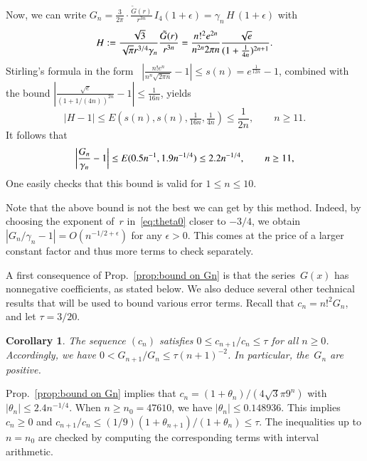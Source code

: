 \documentclass[10pt, conference]{IEEEtran}
\newcommand{\abs}[1]{\mathopen|#1\mathclose|}
\newtheorem{corollary}{Corollary}
\begin{document}
\begin{IEEEproof}
  Now, we can write $G_n = \frac{3}{2\pi}\cdot\frac{\tilde{G}(r)}{r^{3n}}\,I_4(1+\epsilon) = \gamma_n\,H\,(1+\epsilon)$ with
  \[
    H := {\frac{\sqrt{3}}{\sqrt{\pi} r^{3/4} {\gamma}_n}} {\frac{\tilde{G}(r)}{r^{3n}}}\\
    = {\frac{n!^2e^{2n}}{n^{2n}2{\pi}n}}{\frac{\sqrt{e}}{(1+{\frac{1}{4n}})^{2n+1}}}.
  \]
  Stirling's formula in the form~\cite{Robbins1955}
  $\left| \frac{n!e^n}{n^n  \sqrt{2 \pi n}} - 1 \right| \leq s(n) =  e^{\frac1{12n}}-1$,
  combined with the bound
  $ \left| \frac{\sqrt{e}}{(1 + 1 /(4 n))^{2 n}}
     - 1 \right| \leq \frac{1}{16 n} $,
  yields
  \begin{equation}
    \abs{H - 1} \leq E\left(s(n), s(n),
    \tfrac{1}{16 n}, \tfrac{1}{4 n}\right) \leq \frac{1}{2 n},
    \qquad n \geq 11.
    \label{eq:bound A}
  \end{equation}
  It follows that
  \[
    \left|{\frac{G_n}{{\gamma}_n}}-1\right|\leq E(0.5n^{-1},1.9n^{-1/4})\\
    \leq 2.2n^{-1/4},
    \hspace{2em} n \geq 11,
  \]
  One easily checks that this bound is valid for
  $1 \leq n \leq 10$.
\end{IEEEproof}

Note that the above bound is not the best we can get by this method.
Indeed, by choosing the exponent of~$r$ in~\eqref{eq:theta0} closer to $-3/4$, we obtain~$|G_n/\gamma_n-1|=O(n^{-1/2+\epsilon})$ for any $\epsilon>0$. This comes at the price of a larger constant factor and thus more terms to check separately.

A first consequence of Prop.~\ref{prop:bound on Gn} is that the series~$G(x)$ has nonnegative coefficients, as stated below.
We also deduce several other technical results that will be used to bound various error terms.
Recall that $c_n = n!^2 G_n$, and let $\tau = 3/20$.

\begin{corollary}
    \label{cor:positivity}  The sequence $(c_n)$ satisfies $0 \le c_{n+1}/c_n \le \tau$ for all $n \geq 0$. Accordingly, we have $0 < G_{n+1}/G_n \le \tau (n+1)^{-2}$.
    In particular, the~$G_n$ are positive.
\end{corollary}

\begin{IEEEproof}
 Prop.~\ref{prop:bound on Gn} implies that $c_n = (1+\theta_n)/(4\sqrt{3}\pi 9^n)$ with $|\theta_n| \le 2.4 n^{-1/4}$. When $n \ge n_0 = 47610$, we have $|\theta_n| \le 0.148936$. This implies $c_n \ge 0$ and
  $c_{n+1}/c_n \le (1/9)(1+\theta_{n+1})/(1+\theta_n) \le \tau$.
  The inequalities up to $n=n_0$ are checked by computing the corresponding terms with interval arithmetic.
\end{IEEEproof}
\end{document}

